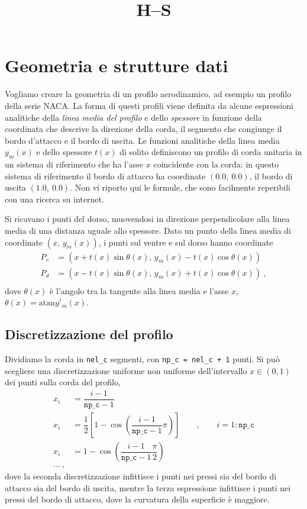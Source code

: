 \documentclass[11pt,fleqn]{article}
\title{H--S}
\begin{document}
\section{Geometria e strutture dati}

Vogliamo creare la geometria di un profilo aerodinamico, ad esempio un profilo della serie NACA. La forma di questi profili viene definita da alcune espressioni analitiche della \textit{linea media del profilo} e dello \textit{spessore} in funzione della coordinata che descrive la direzione della corda, il segmento che congiunge il bordo d'attacco e il bordo di uscita.
Le funzioni analitiche della linea media $y_m(x)$ e dello spessore $t(x)$ di solito definiscono un profilo di corda unitaria in un sistema di riferimento che ha l'asse $x$ coincidente con la corda: in questo sistema di riferimento il bordo di attacco ha coordinate $(0.0,\ 0.0)$, il bordo di uscita $(1.0,\ 0.0)$. Non vi riporto qui le formule, che sono facilmente reperibili con una ricerca su internet.

Si ricavano i punti del dorso, muovendosi in direzione perpendicolare alla linea media di una distanza uguale allo spessore. Dato un punto della linea media di coordinate $(x, \, y_m(x))$, i punti sul ventre e sul dorso hanno coordinate
\begin{equation}
\begin{aligned}
  P_v & = \left( x + t(x) \sin\theta(x), \, y_m(x) - t(x) \cos\theta(x) \right) \\
  P_d & = \left( x - t(x) \sin\theta(x), \, y_m(x) + t(x) \cos\theta(x) \right) \ , \\
\end{aligned}
\end{equation}
dove $\theta(x)$ è l'angolo tra la tangente alla linea media e l'asse $x$, $\theta(x) = \text{atan} y'_m(x)$.

\subsection{Discretizzazione del profilo}
Dividiamo la corda in \texttt{nel\_c} segmenti, con \texttt{np\_c = nel\_c + 1} punti.
Si può scegliere una discretizzazione uniforme non uniforme dell'intervallo $x \in (0,1)$ dei punti sulla corda del profilo, 
\begin{equation}
\begin{aligned}
  x_i & = \dfrac{i-1}{\texttt{np\_c}-1} \\
  x_i & = \dfrac{1}{2}\left[ 1 - \cos\left(\dfrac{i-1}{\texttt{np\_c}-1} \pi \right) \right] \qquad , \qquad i = 1:\texttt{np\_c} \\
  x_i & = 1 - \cos\left(\dfrac{i-1}{\texttt{np\_c}-1} \dfrac{\pi}{2} \right) \\
  \dots \ ,
\end{aligned}
\end{equation}
dove la seconda discretizzazione infittisce i punti nei pressi sia del bordo di attacco sia del bordo di uscita, mentre la terza espressione infittisce i punti nei pressi del bordo di attacco, dove la curvatura della superficie è maggiore.
\end{document}
